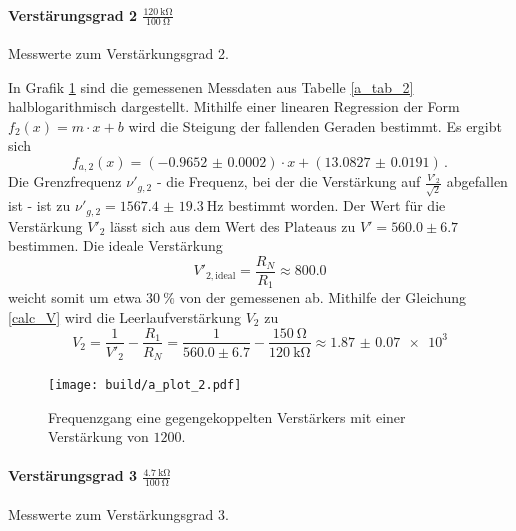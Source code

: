 \paragraph{Verstärungsgrad 2 $\frac{\SI{120}{\kilo\ohm}}{\SI{100}{\ohm}}$}

\begin{table}
\centering
\caption{Messwerte zum Verstärkungsgrad 2.}
    \label{tab:a_messwerte_2}
    
\end{table}

In Grafik \ref{fig:a_plot_2} sind die gemessenen Messdaten aus Tabelle \ref{a_tab_2} halblogarithmisch dargestellt.
Mithilfe einer linearen Regression der Form $f_2(x)= m \cdot x + b$ wird die Steigung der fallenden Geraden bestimmt.
Es ergibt sich
\begin{equation*}
	f_{a,2}(x) = (\num{-0.9652(2)}) \cdot x + (\num{13.0827(191)})\,.
\end{equation*}
Die Grenzfrequenz $\nu'_{g,2}$ - die Frequenz, bei der die Verstärkung auf $\frac{V'_2}{\sqrt{2}}$ abgefallen ist - ist zu $\nu'_{g,2} = \SI{1567.4(193)}{\hertz}$ bestimmt worden.
Der Wert für die Verstärkung $V'_2$ lässt sich aus dem Wert des Plateaus zu $V'=560.0\pm6.7$ bestimmen.
Die ideale Verstärkung 
\begin{equation*}
    V'_{2,\text{ideal}} = \frac{R_N}{R_1} \approx 800.0
\end{equation*}
weicht somit um etwa $\SI{30}{\percent}$ von der gemessenen ab.
Mithilfe der Gleichung \eqref{calc_V} wird die Leerlaufverstärkung $V_2$ zu
\begin{equation*}
	V_2 = \frac{1}{V'_2} - \frac{R_1}{R_N} = \frac{1}{560.0\pm6.7} - \frac{\SI{150}{\ohm}}{\SI{120}{\kilo\ohm}} \approx 
    \num{1.87(7)e3}
\end{equation*}

\begin{figure}[h!]
    \centering
    \texttt{[image: build/a\_plot\_2.pdf]}
    \caption{Frequenzgang eine gegengekoppelten Verstärkers mit einer Verstärkung von $1200$.}
    \label{fig:a_plot_2}
\end{figure}

\paragraph{Verstärungsgrad 3 $\frac{\SI{4.7}{\kilo\ohm}}{\SI{100}{\ohm}}$}

\begin{table}
\centering
\caption{Messwerte zum Verstärkungsgrad 3.}
    \label{tab:a_messwerte_3}
    
\end{table}

